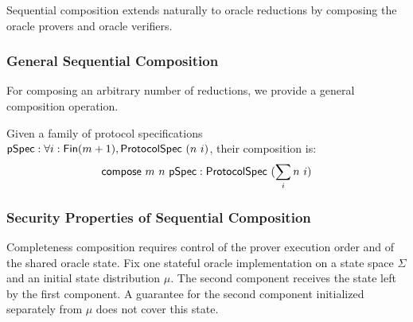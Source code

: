 \begin{definition}
    \label{def:oracle_reduction_append}
    Sequential composition extends naturally to oracle reductions by composing the oracle provers and oracle verifiers.
    \leanok
\end{definition}

\subsubsection{General Sequential Composition}

For composing an arbitrary number of reductions, we provide a general composition operation.

\begin{definition}
    \label{def:protocol_spec_compose}
    Given a family of protocol specifications $\mathsf{pSpec} : \forall i : \mathsf{Fin}(m+1), \mathsf{ProtocolSpec}\ (n\ i)$, their composition is:
    \[ \mathsf{compose}\ m\ n\ \mathsf{pSpec} : \mathsf{ProtocolSpec}\ (\sum_{i} n\ i) \]
    \leanok
\end{definition}

\begin{definition}
    \label{def:prover_compose}
    \leanok
\end{definition}

\begin{definition}
    \label{def:verifier_compose}
    \leanok
\end{definition}

\begin{definition}
    \label{def:reduction_compose}
    \leanok
\end{definition}

\subsubsection{Security Properties of Sequential Composition}

Completeness composition requires control of the prover execution order and of the shared
oracle state. Fix one stateful oracle implementation on a state space $\Sigma$ and an initial
state distribution $\mu$. The second component receives the state left by the first component.
A guarantee for the second component initialized separately from $\mu$ does not cover this state.

